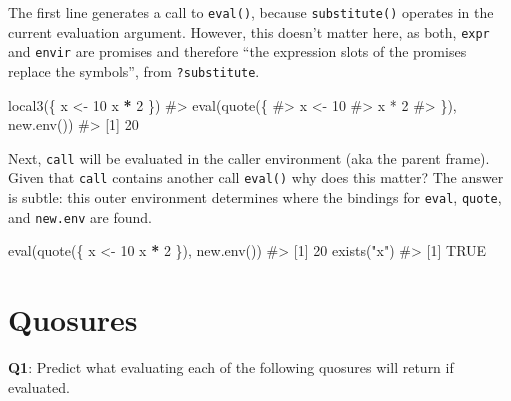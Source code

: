 \documentclass[
]{krantz}
\makeatletter
\newenvironment{Shaded}{\begin{snugshade}}{\end{snugshade}}
\newcommand{\CommentTok}[1]{\textcolor[rgb]{0.56,0.35,0.01}{\textit{#1}}}
\newcommand{\DecValTok}[1]{\textcolor[rgb]{0.00,0.00,0.81}{#1}}
\newcommand{\KeywordTok}[1]{\textcolor[rgb]{0.13,0.29,0.53}{\textbf{#1}}}
\newcommand{\NormalTok}[1]{#1}
\newcommand{\OperatorTok}[1]{\textcolor[rgb]{0.81,0.36,0.00}{\textbf{#1}}}
\newcommand{\StringTok}[1]{\textcolor[rgb]{0.31,0.60,0.02}{#1}}
\newenvironment{kframe}{%
\medskip{}
\setlength{\fboxsep}{.8em}
 \def\at@end@of@kframe{}%
 \ifinner\ifhmode%
  \def\at@end@of@kframe{\end{minipage}}%
  \begin{minipage}{\columnwidth}%
 \fi\fi%
 \def\FrameCommand##1{\hskip\@totalleftmargin \hskip-\fboxsep
 \colorbox{shadecolor}{##1}\hskip-\fboxsep
     \hskip-\linewidth \hskip-\@totalleftmargin \hskip\columnwidth}%
 \MakeFramed {\advance\hsize-\width
   \@totalleftmargin\z@ \linewidth\hsize
   \@setminipage}}%
 {\par\unskip\endMakeFramed%
 \at@end@of@kframe}
\renewenvironment{Shaded}{\begin{kframe}}{\end{kframe}}
\renewcommand{\KeywordTok} [1]{\textcolor[rgb]{0.00,0.44,0.13}{{#1}}}
\renewcommand{\DecValTok}  [1]{\textcolor[rgb]{0.25,0.63,0.44}{{#1}}}
\renewcommand{\StringTok}  [1]{\textcolor[rgb]{0.25,0.44,0.63}{{#1}}}
\renewcommand{\CommentTok} [1]{\textcolor[rgb]{0.38,0.63,0.69}{{#1}}}
\renewcommand{\NormalTok}  [1]{{#1}}
\makeatother
\begin{document}
The first line generates a call to \texttt{eval()}, because \texttt{substitute()} operates in the current evaluation argument. However, this doesn't matter here, as both, \texttt{expr} and \texttt{envir} are promises and therefore ``the expression slots of the promises replace the symbols'', from \texttt{?substitute}.

\begin{Shaded}
\begin{Highlighting}[]
\KeywordTok{local3}\NormalTok{(\{}
\NormalTok{  x <-}\StringTok{ }\DecValTok{10}
\NormalTok{  x }\OperatorTok{*}\StringTok{ }\DecValTok{2}
\NormalTok{\})}
\CommentTok{#> eval(quote(\{}
\CommentTok{#>     x <- 10}
\CommentTok{#>     x * 2}
\CommentTok{#> \}), new.env())}
\CommentTok{#> [1] 20}
\end{Highlighting}
\end{Shaded}

Next, \texttt{call} will be evaluated in the caller environment (aka the parent frame). Given that \texttt{call} contains another call \texttt{eval()} why does this matter? The answer is subtle: this outer environment determines where the bindings for \texttt{eval}, \texttt{quote}, and \texttt{new.env} are found.

\begin{Shaded}
\begin{Highlighting}[]
\KeywordTok{eval}\NormalTok{(}\KeywordTok{quote}\NormalTok{(\{}
\NormalTok{  x <-}\StringTok{ }\DecValTok{10}
\NormalTok{  x }\OperatorTok{*}\StringTok{ }\DecValTok{2}
\NormalTok{\}), }\KeywordTok{new.env}\NormalTok{())}
\CommentTok{#> [1] 20}
\KeywordTok{exists}\NormalTok{(}\StringTok{"x"}\NormalTok{)}
\CommentTok{#> [1] TRUE}
\end{Highlighting}
\end{Shaded}

\hypertarget{quosures}{%
\section{Quosures}\label{quosures}}

\textbf{{Q1}}: Predict what evaluating each of the following quosures will return if evaluated.
\end{document}
